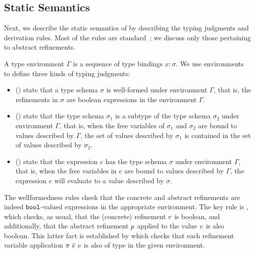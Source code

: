 \subsection{Static Semantics}\label{sec:typing}



Next, we describe the static semantics of \corelan by describing the typing
judgments and derivation rules. Most of the rules are 
standard~\cite{Ou2004,LiquidPLDI08,Knowles10,GordonTOPLAS2011}; we 
discuss only those pertaining to abstract refinements.

A type environment $\Gamma$ is a sequence of type bindings $x:\sigma$.
We use environments to define three kinds of typing judgments:

\begin{itemize}
\item{ (\isWellFormed{\Gamma}{\sigma})} 
state that a type schema $\sigma$ is well-formed under environment
$\Gamma$, that is, the refinements in $\sigma$ are boolean 
expressions in the environment $\Gamma$.

\item{ ()} 
state that the type schema $\sigma_1$ is a subtype of the type schema
$\sigma_2$ under environment $\Gamma$, that is, when the free variables
of $\sigma_1$ and $\sigma_2$
are bound to values described by $\Gamma$, the set of values described
by $\sigma_1$ is contained in the set of values described by $\sigma_2$. 

\item{ ()} state that
the expression $e$ has the type schema $\sigma$ under environment $\Gamma$,
that is, when the free variables in $e$ are bound to values described by 
$\Gamma$, the expression $e$ will evaluate to a value described by $\sigma$.
\end{itemize}

The wellformedness rules check that the concrete and abstract
refinements are indeed $\texttt{bool}$-valued expressions in the 
appropriate environment.
The key rule is \wtBase, which checks, as usual, that the (concrete) 
refinement $e$ is boolean, and additionally, that the abstract
refinement $p$ applied to the value $v$ is also boolean.
This latter fact is established by \wtRVApp which checks that 
each refinement variable application ${\pi \ \overline{e}}\ v$ 
is also of type \tbbool in the given environment.

